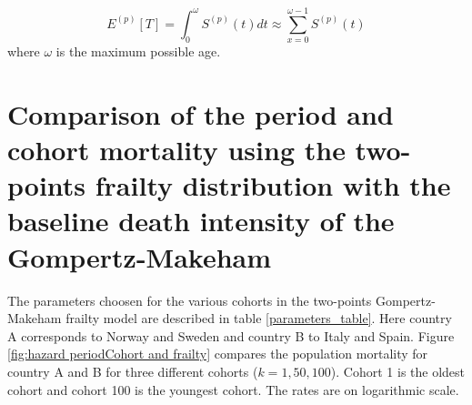 \begin{equation}
    E^{(p)}[T] = \int_{0}^{\omega} S^{(p)}(t)dt \approx \sum\limits_{x=0}^{\omega -1} S^{(p)}(t) 
\end{equation}
where $\omega$ is the maximum possible age.


    
    

\section{Comparison of the period and cohort mortality using the two-points frailty distribution with the baseline death intensity of the Gompertz-Makeham}

The parameters choosen for the various cohorts in the two-points Gompertz-Makeham frailty model are described in table \ref{parameters_table}. Here country A corresponds to Norway and Sweden and country B to Italy and Spain.
Figure \ref{fig:hazard periodCohort and frailty} compares the population mortality for country A and B for three different cohorts ($ k = 1, 50, 100 $).
Cohort 1 is the oldest cohort and cohort 100 is the youngest cohort. The rates are on logarithmic scale.


